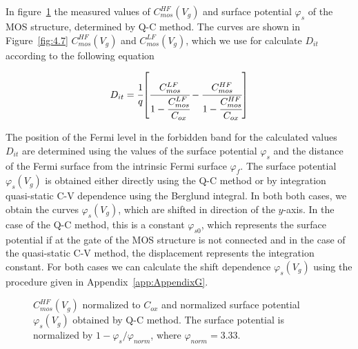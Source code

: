 In figure~\ref{fig:4.6} the measured values of $C_{mos}^{HF}(V_{g})$
and surface potential $\varphi_{s}$ of the MOS structure, determined
by Q-C method. The curves are shown in Figure~\ref{fig:4.7}
$C_{mos}^{HF}(V_{g})$ and $C_{mos}^{LF}(V_{g})$, which we use for
calculate $D_{it}$ according to the following equation~\cite{4.15}

\begin{equation}\label{eq:4.15}
  D_{it} = {\cfrac{1}{q}} {\left[\cfrac{C_{mos}^{LF}}{1-\cfrac{C_{mos}^{LF}}{C_{ox}}}-\cfrac{C_{mos}^{HF}}{1-\cfrac{C_{mos}^{HF}}{C_{ox}}}\right]}
\end{equation}

The position of the Fermi level in the forbidden band for the
calculated values $D_{it}$ are determined using the values of the
surface potential $\varphi_{s}$ and the distance of the Fermi surface
from the intrinsic Fermi surface $\varphi_{f}$. The surface potential
$\varphi_{s} (V_{g})$ is obtained either directly using the Q-C method
or by integration quasi-static C-V dependence using the Berglund
integral. In both both cases, we obtain the curves
$\varphi_{s} (V_{g})$, which are shifted in direction of the
$y$-axis. In the case of the Q-C method, this is a constant
$\varphi_{s0}$, which represents the surface potential if at the gate
of the MOS structure is not connected and in the case of the
quasi-static C-V method, the displacement represents the integration
constant. For both cases we can calculate the shift dependence
$\varphi_{s} (V_{g})$ using the procedure given in
Appendix~\ref{app:AppendixG}.

\newpage
\begin{figure}[h!]\centering
  \begin{minipage}[c]{\myfiguresize}
    \begin{center}
      
      \caption[HF C-V $C_{mos}^{HF}(V_{g})$ and surface potential
        $\varphi_{s}(V_{g})$ of the MOS structure obtained using the
        Q-C method]{$C_{mos}^{HF}(V_{g})$ normalized to $C_{ox}$ and
        normalized surface potential $\varphi_{s}(V_{g})$ obtained by
        Q-C method. The surface potential is normalized by
        $1-{\varphi_{s}}/{\varphi_{norm}}$, where
        $\varphi_{norm}=3.33$.}\label{fig:4.6}
    \end{center}
  \end{minipage}
\end{figure}

